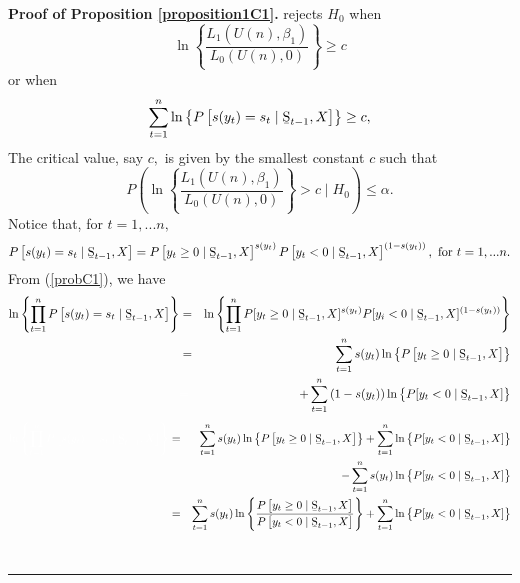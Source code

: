 \documentclass[harvard,11pt]{article}
\newenvironment{proof}[1][Proof]{\textbf{#1.} }{\  \rule{0.5em}{0.5em}}
\begin{document}
\begin{proof}[Proof of Proposition \protect\ref{proposition1C1}]
rejects $H_{0}$ when%
\begin{equation*}
\ln \left\{ \frac{L_{1}\left( U(n),\beta _{1}\right) }{L%
_{0}\left( U(n),0\right) }\right\} \geq c
\end{equation*}%
or when%
\begin{equation*}
\sum\limits_{t=1}^{n}\ln \left\{ P\left[ s(y_{t})=s_{t}\mid \text{%
\b{S}}_{t-1},X\right] \right\} \geq c,
\end{equation*}%
The critical value, say $c,$ is given by the smallest constant $c$ such that%
\begin{equation*}
P\left( \ln \left\{ \frac{L_{1}\left( U(n),\beta
_{1}\right) }{L_{0}\left( U(n),0\right) }\right\} >c\mid
H_{0}\right) \leq \alpha .
\end{equation*}%
Notice that, for $t=1,...n,$%
\begin{equation}
P\left[ s(y_{t})=s_{t}\mid \text{\b{S}}_{t-1},X\right] =P%
\left[ y_{t}\geq 0\mid \text{\b{S}}_{t-1},X\right] ^{s(y_t)}P\left[
y_{t}<0\mid \text{\b{S}}_{t-1},X\right] ^{(1-s(y_t))},\text{ for }t=1,...n.
\label{probC1}
\end{equation}%
From (\ref{probC1}), we have%
\begin{eqnarray*}
\ln \left\{ \prod\limits_{t=1}^{n}P\left[
s(y_{t})=s_{t}\mid \text{\b{S}}_{t-1},X\right] \right\} &=&\ln \left\{ \prod\limits_{t=1}^{n} 
P[y_{t}\geq 0\mid \text{\b{S}}%
_{t-1},X]^{s(y_t)}P[y_{i}<0\mid \text{\b{S}}_{t-1},X]^{(1-s(y_t))}\right\}
\\
&=&\sum\limits_{t=1}^{n}s(y_{t})\ln \left\{ P\left[ y_{t}\geq 0\mid 
\text{\b{S}}_{t-1},X\right] \right\}\\
&\textcolor{white}{=}&+\sum\limits_{t=1}^{n}\left(
1-s(y_{t})\right) \ln \left\{ P[y_{t}<0\mid \text{\b{S}}%
_{t-1},X]\right\} 
\end{eqnarray*}
\begin{eqnarray*}
\textcolor{white}{\ln \left\{ \prod\limits_{t=1}^{n}P\left[
s(y_{t})=s_{t}\mid \text{\b{S}}_{t-1},X\right] \right\} }&=&\sum\limits_{t=1}^{n}s(y_{t})\ln \left\{ P\left[ y_{t}\geq 0\mid 
\text{\b{S}}_{t-1},X\right] \right\} +\sum\limits_{t=1}^{n}\ln \left\{ P [y_{t}<0\mid \text{\b{S}}_{t-1},X]\right\} \\
&&-\sum\limits_{t=1}^{n}s(y_{t})\ln \left\{ P[y_{t}<0\mid \text{\b{S%
}}_{t-1},X]\right\} \\
&=&\sum\limits_{t=1}^{n}s(y_{t})\ln \left\{ \frac{P\left[ y_{t}\geq
0\mid \text{\b{S}}_{t-1},X\right] }{P\left[ y_{t}<0\mid \text{\b{S}}%
_{t-1},X\right] }\right\} +\sum\limits_{t=1}^{n}\ln \left\{ P%
[y_{t}<0\mid \text{\b{S}}_{t-1},X]\right\}

\end{eqnarray*}
\end{proof}
\end{document}
